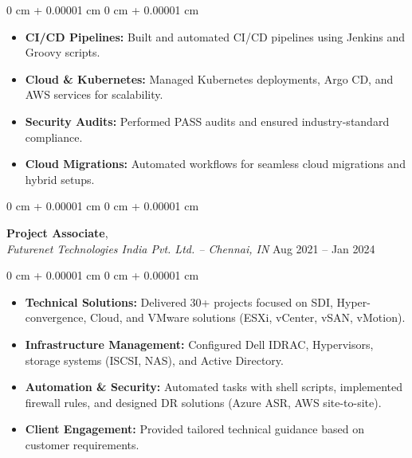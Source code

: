 \documentclass[10pt, letterpaper]{article}
\newenvironment{highlights}{
    \begin{itemize}[
        topsep=0.10 cm,
        parsep=0.10 cm,
        partopsep=0pt,
        itemsep=0pt,
        leftmargin=0 cm + 10pt
    ]
}{
    \end{itemize}
} %
\newenvironment{onecolentry}{
    \begin{adjustwidth}{
        0 cm + 0.00001 cm
    }{
        0 cm + 0.00001 cm
    }
}{
    \end{adjustwidth}
} %
\newenvironment{twocolentry}[2][]{
    \onecolentry
    \def\secondColumn{#2}
    \setcolumnwidth{\fill, 4.5 cm}
    \begin{paracol}{2}
}{
    \switchcolumn \raggedleft \secondColumn
    \end{paracol}
    \endonecolentry
} %
\begin{document}
        \vspace{0.18 cm}
        \begin{onecolentry}
            \begin{highlights}
                \item 
\textbf{CI/CD Pipelines:} Built and automated CI/CD pipelines using Jenkins and Groovy scripts.
 
                \item
\textbf{Cloud \& Kubernetes:} Managed Kubernetes deployments, Argo CD, and AWS services for scalability.
 
                \item 
\textbf{Security Audits:} Performed PASS audits and ensured industry-standard compliance.
                 \item 
\textbf{Cloud Migrations:} Automated workflows for seamless cloud migrations and hybrid setups.
 
            \end{highlights}
        \end{onecolentry}


        \vspace{0.25 cm}

        \begin{twocolentry}{
            Aug 2021 – Jan 2024
        }
            \textbf{Project Associate},\\ \textit{Futurenet Technologies India Pvt. Ltd. -- Chennai, IN}\end{twocolentry}

        \vspace{0.18 cm}
        \begin{onecolentry}
            \begin{highlights}
                \item 
\textbf{Technical Solutions:} Delivered 30+ projects focused on SDI, Hyper-convergence, Cloud, and VMware solutions (ESXi, vCenter, vSAN, vMotion).
 
                \item 
\textbf{Infrastructure Management:} Configured Dell IDRAC, Hypervisors, storage systems (ISCSI, NAS), and Active Directory.
 
                \item
\textbf{Automation \& Security:} Automated tasks with shell scripts, implemented firewall rules, and designed DR solutions (Azure ASR, AWS site-to-site).
 
                \item 
\textbf{Client Engagement:} Provided tailored technical guidance based on customer requirements.
            \end{highlights}
        \end{onecolentry}
\end{document}
